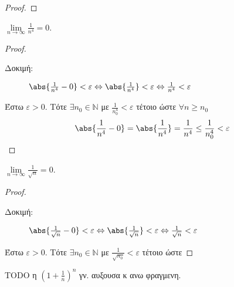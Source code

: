 \documentclass[main.tex]{subfiles}
\begin{document}
\begin{examples}
\begin{enumerate}[i)]
\begin{proof}
            \end{proof}

         \item $ \lim\limits_{n \to \infty} \frac{1}{n^{4}} = 0 $. 
             \begin{proof}
             \item {}
                 \begin{description}
                     \item[Δοκιμή:]$ \abs{\frac{1}{n^{4}} - 0} < \varepsilon 
                         \Leftrightarrow \abs{\frac{1}{n^{4}}} < \varepsilon 
                         \Leftrightarrow \frac{1}{n^{4}} < \varepsilon $
                 \end{description}
                 Έστω $ \varepsilon >0 $. Τότε $ \exists n_{0}  \in 
                 \mathbb{N}$ με $ \frac{1}{n_{0}^{4}} < \varepsilon $ 
                 τέτοιο ώστε $ \forall n \geq n_{0} $ 
                 \[
                     \abs{\frac{1}{n^{4}} - 0 } = \abs{\frac{1}{n^{4}}} 
                     = \frac{1}{n^{4}} \leq \frac{1}{n_{0}^{4}} < \varepsilon
                  \] 
             \end{proof}

         \item $ \lim\limits_{n \to \infty} \frac{1}{\sqrt{n}} = 0$.
             \begin{proof}
             \item {}
                 \begin{description}
                     \item[Δοκιμή:] $ \abs{\frac{1}{\sqrt{n}}-0 } 
                         < \varepsilon 
                         \Leftrightarrow \abs{\frac{1}{\sqrt{n}} } < 
                         \varepsilon 
                         \Leftrightarrow \frac{1}{\sqrt{n}} < 
                         \varepsilon $
                 \end{description}
                 Έστω $ \varepsilon > 0 $. Τότε $ \exists n_{0} \in \mathbb{N} $
                 με $ \frac{1}{\sqrt{n_{0}}} < \varepsilon $ τέτοιο ώστε 
             \end{proof}
     \end{enumerate}
 \end{examples}

 TODO η $ (1+ \frac{1}{n} )^{n} $ γν. αυξουσα κ ανω φραγμενη.
\end{document}
